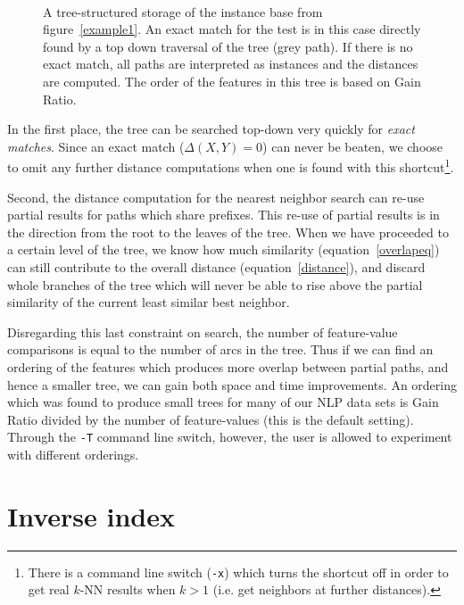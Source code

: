 \documentclass{report}
\begin{document}
\begin{figure}[htb]
        \begin{center}
                \leavevmode
                \epsfxsize=10cm
                \
                \caption{A tree-structured storage of the instance
                base from figure~\ref{example1}. An exact match for
                the test is in this case directly found by a top down
                traversal of the tree (grey path). If there is no
                exact match, all paths are interpreted as instances
                and the distances are computed. The order of the
                features in this tree is based on Gain Ratio.
                }
                \label{example2}
        \end{center}
\end{figure}


In the first place, the tree can be searched top-down very quickly for
{\em exact matches}. Since an exact match ($\Delta(X,Y)=0$) can never
be beaten, we choose to omit any further distance computations when
one is found with this shortcut\footnote{There is a command line
switch ({\tt -x}) which turns the shortcut off in order to get real $k$-NN
results when $k>1$ (i.e. get neighbors at further distances).}.

Second, the distance computation for the nearest neighbor
search can re-use partial results for paths which share prefixes.
This re-use of partial results is in the direction from the root to
the leaves of the tree. When we have proceeded to a certain level of
the tree, we know how much similarity (equation~\ref{overlapeq}) can
still contribute to the overall distance (equation~\ref{distance}),
and discard whole branches of the tree which will never be able to
rise above the partial similarity of the current least similar best
neighbor. 

Disregarding this last constraint on search, the number of feature-value
comparisons is equal to the number of arcs in the tree. Thus if we can
find an ordering of the features which produces more overlap between
partial paths, and hence a smaller tree, we can gain both space and
time improvements. An ordering which was found to produce small trees
for many of our NLP data sets is Gain Ratio divided by the number of
feature-values (this is the default setting). Through the {\tt -T}
command line switch, however, the user is allowed to experiment with
different orderings.

\section{Inverse index}
\label{inverse-index}
\end{document}
